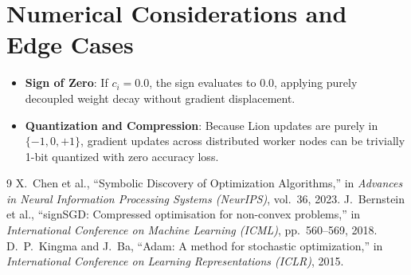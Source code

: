 \documentclass[11pt,a4paper]{article}
\theoremstyle{definition}
\begin{document}
\section{Numerical Considerations and Edge Cases}

\begin{itemize}
    \item \textbf{Sign of Zero}: If $c_i = 0.0$, the sign evaluates to $0.0$, applying purely decoupled weight decay without gradient displacement.
    \item \textbf{Quantization and Compression}: Because Lion updates are purely in $\{-1, 0, +1\}$, gradient updates across distributed worker nodes can be trivially 1-bit quantized with zero accuracy loss.
\end{itemize}

\begin{thebibliography}{9}
 X.~Chen et al., ``Symbolic Discovery of Optimization Algorithms,'' in \emph{Advances in Neural Information Processing Systems (NeurIPS)}, vol.~36, 2023.
 J.~Bernstein et al., ``signSGD: Compressed optimisation for non-convex problems,'' in \emph{International Conference on Machine Learning (ICML)}, pp.~560--569, 2018.
 D.~P.~Kingma and J.~Ba, ``Adam: A method for stochastic optimization,'' in \emph{International Conference on Learning Representations (ICLR)}, 2015.
\end{thebibliography}
\end{document}
